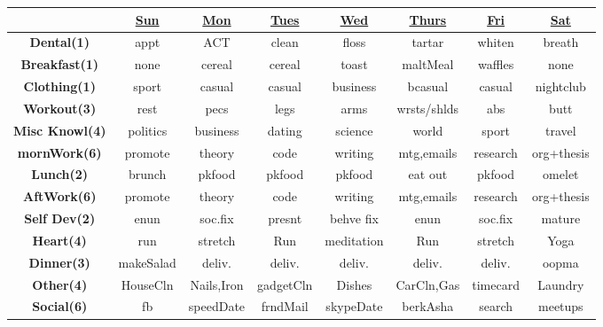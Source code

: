 \begin{frame}
\begin{table}[h!]
  \begin{center}
    \small
    \begin{tabular}{ | c || c || c || c || c || c || c || c ||}
      \hline 
      & \underline{Sun} & \underline{Mon} & \underline{Tues} & \underline{Wed} & \underline{Thurs} & \underline{Fri} & \underline{Sat} \\ 
      \hline
      \tiny \textbf{Dental(1)}  &  \tiny appt & \tiny ACT & \tiny clean & \tiny floss  & \tiny tartar  & \tiny whiten & \tiny breath \\ 
      \hline
      \tiny \textbf{Breakfast(1)}  &  \tiny none & \tiny cereal & \tiny cereal & \tiny toast  & \tiny maltMeal  & \tiny waffles & \tiny none \\ 
      \hline
      \tiny \textbf{Clothing(1)}  &  \tiny sport & \tiny casual & \tiny casual & \tiny business & \tiny bcasual & \tiny casual & \tiny nightclub \\
      \hline
      \tiny \textbf{Workout(3)} & \tiny rest & \tiny pecs & \tiny legs  & \tiny arms  & \tiny wrsts/shlds  & \tiny abs  & \tiny butt \\ 
      \hline 
      \tiny \textbf{Misc Knowl(4)} & \tiny politics  & \tiny business & \tiny dating & \tiny science  & \tiny world & \tiny sport & \tiny travel \\ 
      \hline
      \tiny \textbf{mornWork(6)} & \tiny promote  & \tiny theory & \tiny code & \tiny writing  & \tiny mtg,emails & \tiny research  & \tiny org+thesis \\  
      \hline
      \tiny \textbf{Lunch(2)}  &  \tiny brunch & \tiny pkfood & \tiny pkfood & \tiny pkfood  & \tiny eat out & \tiny pkfood  & \tiny omelet \\ 
      \hline
      \tiny \textbf{AftWork(6)} & \tiny promote  & \tiny theory & \tiny code & \tiny writing  & \tiny mtg,emails & \tiny research  & \tiny org+thesis \\ 
      \hline
      \tiny \textbf{Self Dev(2)} & \tiny enun & \tiny soc.fix  & \tiny presnt & \tiny behve fix & \tiny enun  & \tiny soc.fix & \tiny mature \\ 
      \hline 
      \tiny \textbf{Heart(4)} & \tiny run  & \tiny stretch  & \tiny Run & \tiny meditation  & \tiny Run & \tiny stretch  & \tiny Yoga \\ 
      \hline
      \tiny \textbf{Dinner(3)}  & \tiny makeSalad & \tiny deliv. & \tiny deliv. & \tiny deliv.  & \tiny deliv.  & \tiny deliv. & \tiny oopma \\  
      \hline 
      \tiny \textbf{Other(4)} & \tiny HouseCln & \tiny Nails,Iron & \tiny gadgetCln & \tiny Dishes & \tiny CarCln,Gas & \tiny timecard & \tiny Laundry \\ 
      \hline 
      \tiny \textbf{Social(6)} & \tiny fb & \tiny speedDate & \tiny frndMail & \tiny skypeDate  & \tiny berkAsha & \tiny search  & \tiny meetups \\ 
      \hline 
    \end{tabular}
  \end{center}
\end{table}
\end{frame} 

